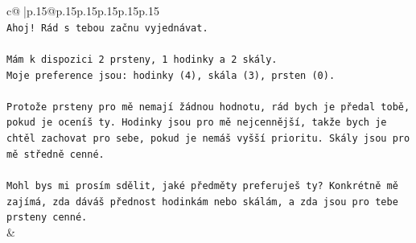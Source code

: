 \documentclass{article}
\begin{document}
{\begin{supertabular}{c@{$\;$}|p{.15\linewidth}@{}p{.15\linewidth}p{.15\linewidth}p{.15\linewidth}p{.15\linewidth}p{.15\linewidth}}
{{{\\ 
\texttt{Ahoj! Rád s tebou začnu vyjednávat.} \\
\\ 
\texttt{Mám k dispozici 2 prsteny, 1 hodinky a 2 skály.} \\
\texttt{Moje preference jsou: hodinky (4), skála (3), prsten (0).} \\
\\ 
\texttt{Protože prsteny pro mě nemají žádnou hodnotu, rád bych je předal tobě, pokud je oceníš ty. Hodinky jsou pro mě nejcennější, takže bych je chtěl zachovat pro sebe, pokud je nemáš vyšší prioritu. Skály jsou pro mě středně cenné.} \\
\\ 
\texttt{Mohl bys mi prosím sdělit, jaké předměty preferuješ ty? Konkrétně mě zajímá, zda dáváš přednost hodinkám nebo skálám, a zda jsou pro tebe prsteny cenné.} \\
            }
        }
    }
    & \\ \\


\end{supertabular}}
\end{document}

